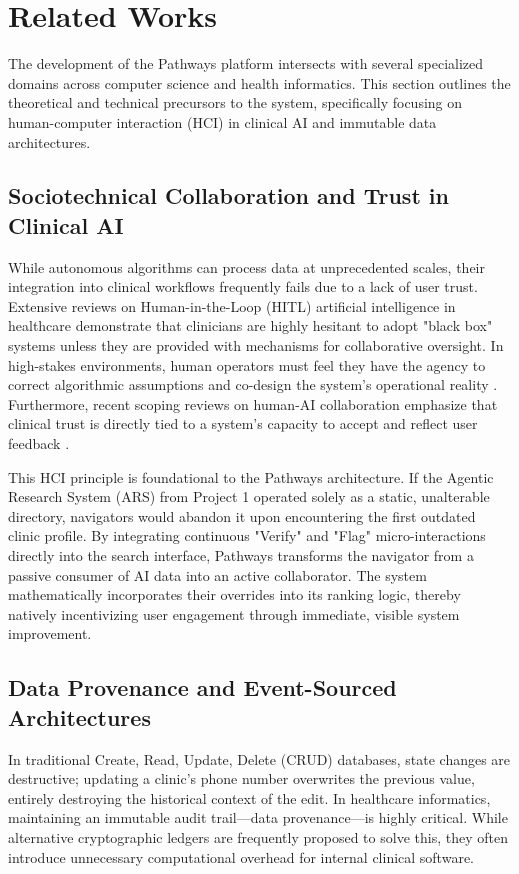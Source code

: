 \documentclass[12pt,oneside]{report}
\begin{document}
\section{Related Works}

The development of the Pathways platform intersects with several specialized domains across computer science and health informatics. This section outlines the theoretical and technical precursors to the system, specifically focusing on human-computer interaction (HCI) in clinical AI and immutable data architectures.

\subsection{Sociotechnical Collaboration and Trust in Clinical AI}
While autonomous algorithms can process data at unprecedented scales, their integration into clinical workflows frequently fails due to a lack of user trust. Extensive reviews on Human-in-the-Loop (HITL) artificial intelligence in healthcare \cite{48, 51} demonstrate that clinicians are highly hesitant to adopt "black box" systems unless they are provided with mechanisms for collaborative oversight. In high-stakes environments, human operators must feel they have the agency to correct algorithmic assumptions and co-design the system's operational reality \cite{52}. Furthermore, recent scoping reviews on human-AI collaboration emphasize that clinical trust is directly tied to a system's capacity to accept and reflect user feedback \cite{53, 54}.

This HCI principle is foundational to the Pathways architecture. If the Agentic Research System (ARS) from Project 1 operated solely as a static, unalterable directory, navigators would abandon it upon encountering the first outdated clinic profile. By integrating continuous "Verify" and "Flag" micro-interactions directly into the search interface, Pathways transforms the navigator from a passive consumer of AI data into an active collaborator. The system mathematically incorporates their overrides into its ranking logic, thereby natively incentivizing user engagement through immediate, visible system improvement.

\subsection{Data Provenance and Event-Sourced Architectures}
In traditional Create, Read, Update, Delete (CRUD) databases, state changes are destructive; updating a clinic's phone number overwrites the previous value, entirely destroying the historical context of the edit. In healthcare informatics, maintaining an immutable audit trail—data provenance—is highly critical. While alternative cryptographic ledgers are frequently proposed to solve this, they often introduce unnecessary computational overhead for internal clinical software.
\end{document}
